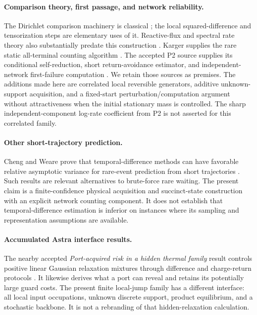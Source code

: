 \documentclass[10pt,a4paper]{article}
\theoremstyle{definition}\newtheorem{assumption}[theorem]{Assumption}
\begin{document}
\paragraph{Comparison theory, first passage, and network reliability.}
The Dirichlet comparison machinery is classical \cite{comparison}; the local squared-difference and tensorization steps are elementary uses of it. Reactive-flux and spectral rate theory also substantially predate this construction \cite{spectral}. Karger supplies the rare static all-terminal counting algorithm \cite{karger}. The accepted P2 source supplies its conditional self-reduction, short return-avoidance estimator, and independent-network first-failure computation \cite{p2}. We retain those sources as premises. The additions made here are correlated local reversible generators, additive unknown-support acquisition, and a fixed-start perturbation/computation argument without attractiveness when the initial stationary mass is controlled. The sharp independent-component log-rate coefficient from P2 is not asserted for this correlated family.

\paragraph{Other short-trajectory prediction.}
Cheng and Weare prove that temporal-difference methods can have favorable relative asymptotic variance for rare-event prediction from short trajectories \cite{td}. Such results are relevant alternatives to brute-force rare waiting. The present claim is a finite-confidence physical acquisition and succinct-state construction with an explicit network counting component. It does not establish that temporal-difference estimation is inferior on instances where its sampling and representation assumptions are available.

\paragraph{Accumulated Astra interface results.}
The nearby accepted \emph{Port-acquired risk in a hidden thermal family} result controls positive linear Gaussian relaxation mixtures through difference and charge-return protocols \cite{n1607}. It likewise derives what a port can reveal and retains its potentially large guard costs. The present finite local-jump family has a different interface: all local input occupations, unknown discrete support, product equilibrium, and a stochastic backbone. It is not a rebranding of that hidden-relaxation calculation.
\end{document}

